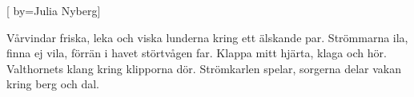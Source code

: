 


[ 	%
	by={Julia Nyberg}]		%
	
\beginverse*		%
Vårvindar friska, leka och viska
lunderna kring ett älskande par.
Strömmarna ila, finna ej vila,
förrän i havet störtvågen far.
Klappa mitt hjärta, klaga och hör.
Valthornets klang kring klipporna dör.
Strömkarlen spelar, sorgerna delar
vakan kring berg och dal.
\endverse			%
\endsong			%
